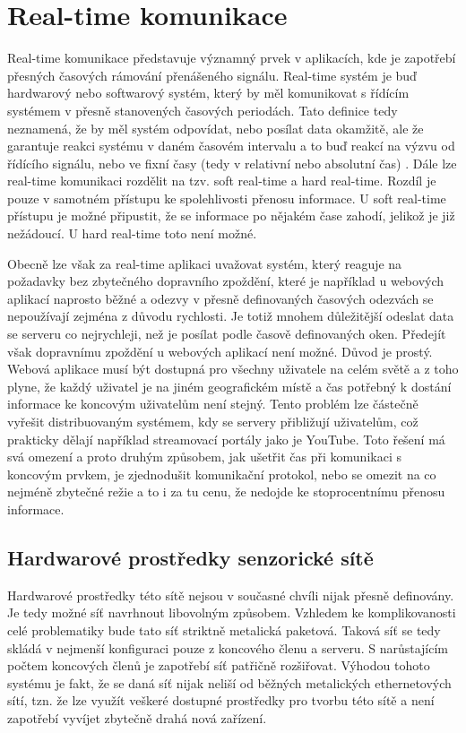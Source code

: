 \chapter{Real-time komunikace}
Real-time komunikace představuje významný prvek v aplikacích, kde je zapotřebí přesných časových rámování přenášeného signálu. Real-time systém je buď hardwarový nebo softwarový systém, který by měl komunikovat s řídícím systémem v přesně stanovených časových periodách. Tato definice tedy neznamená, že by měl systém odpovídat, nebo posílat data okamžitě, ale že garantuje reakci systému v daném časovém intervalu a to buď reakcí na výzvu od řídícího signálu, nebo ve fixní časy (tedy v relativní nebo absolutní čas) \cite{real-time}. Dále lze real-time komunikaci rozdělit na tzv. soft real-time a hard real-time. Rozdíl je pouze v samotném přístupu ke spolehlivosti přenosu informace. U soft real-time přístupu je možné připustit, že se informace po nějakém čase zahodí, jelikož je již nežádoucí. U hard real-time toto není možné.

Obecně lze však za real-time aplikaci uvažovat systém, který reaguje na požadavky bez zbytečného dopravního zpoždění, které je například u webových aplikací naprosto běžné a odezvy v přesně definovaných časových odezvách se nepoužívají zejména z důvodu rychlosti. Je totiž mnohem důležitější odeslat data se serveru co nejrychleji, než je posílat podle časově definovaných oken. Předejít však dopravnímu zpoždění u webových aplikací není možné. Důvod je prostý. Webová aplikace musí být dostupná pro všechny uživatele na celém světě a z toho plyne, že každý uživatel je na jiném geografickém místě a čas potřebný k dostání informace ke koncovým uživatelům není stejný. Tento problém lze částečně vyřešit distribuovaným systémem, kdy se servery přibližují uživatelům, což prakticky dělají například streamovací portály jako je YouTube. Toto řešení má svá omezení a proto druhým způsobem, jak ušetřit čas při komunikaci s koncovým prvkem, je zjednodušit komunikační protokol, nebo se omezit na co nejméně zbytečné režie a to i za tu cenu, že nedojde ke stoprocentnímu přenosu informace.

\section{Hardwarové prostředky senzorické sítě}
Hardwarové prostředky této sítě nejsou v současné chvíli nijak přesně definovány. Je tedy možné síť navrhnout libovolným způsobem. Vzhledem ke komplikovanosti celé problematiky bude tato síť striktně metalická paketová. Taková síť se tedy skládá v nejmenší konfiguraci pouze z koncového členu a serveru. S narůstajícím počtem koncových členů je zapotřebí síť patřičně rozšiřovat. Výhodou tohoto systému je fakt, že se daná síť nijak neliší od běžných metalických ethernetových sítí, tzn. že lze využít veškeré dostupné prostředky pro tvorbu této sítě a není zapotřebí vyvíjet zbytečně drahá nová zařízení.


